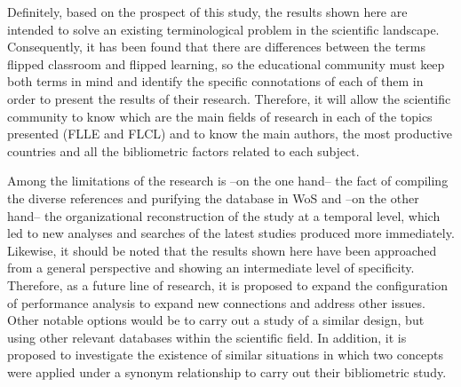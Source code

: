 \documentclass{textolivre-html}
\begin{document}
Definitely, based on the prospect of this study, the results shown here are intended to solve an existing terminological problem in the scientific landscape. Consequently, it has been found that there are differences between the terms flipped classroom and flipped learning, so the educational community must keep both terms in mind and identify the specific connotations of each of them in order to present the results of their research. Therefore, it will allow the scientific community to know which are the main fields of research in each of the topics presented (FLLE and FLCL) and to know the main authors, the most productive countries and all the bibliometric factors related to each subject.

Among the limitations of the research is –on the one hand– the fact of compiling the diverse references and purifying the database in WoS and –on the other hand– the organizational reconstruction of the study at a temporal level, which led to new analyses and searches of the latest studies produced more immediately. Likewise, it should be noted that the results shown here have been approached from a general perspective and showing an intermediate level of specificity. Therefore, as a future line of research, it is proposed to expand the configuration of performance analysis to expand new connections and address other issues. Other notable options would be to carry out a study of a similar design, but using other relevant databases within the scientific field. In addition, it is proposed to investigate the existence of similar situations in which two concepts were applied under a synonym relationship to carry out their bibliometric study.

\printbibliography\label{sec-bib}
\end{document}
